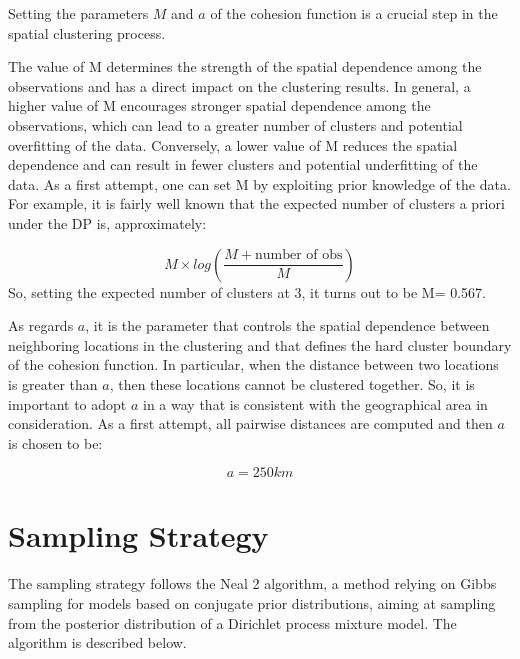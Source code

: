 \documentclass[12pt,a4paper]{article}
\begin{document}
Setting the parameters $M$ and $a$ of the cohesion function is a crucial step in the spatial clustering process. 
 
The value of M determines the strength of the spatial dependence among the observations and has a direct impact on the clustering results. In general, a higher value of M encourages stronger spatial dependence among the observations, which can lead to a greater number of clusters and potential overfitting of the data. Conversely, a lower value of M reduces the spatial dependence and can result in fewer clusters and potential underfitting of the data. 
As a first attempt, one can set M by exploiting prior knowledge of the data. For example, it is fairly well known that the expected number of clusters a priori under the DP is, approximately:

$$
M \times log \left( \frac{M+ \text{number of obs} }{M} \right)
$$
So, setting the expected number of clusters at 3, it turns out to be M= 0.567.


As regards $a$, it is the parameter that controls the spatial dependence between neighboring locations in the clustering and that defines the hard cluster boundary of the cohesion function. In particular, when the distance between two locations is greater than $a$, then these locations cannot be clustered together. So, it is important to adopt $a$ in a way that is consistent with the geographical area in consideration. As a first attempt, all pairwise distances are computed and then $a$ is chosen to be:

$$
a= 250 km
$$



\newpage
\section{Sampling Strategy}\label{sec:ss}
The sampling strategy follows the Neal 2 algorithm, a method relying on Gibbs sampling for models based on conjugate prior distributions, aiming at sampling from the posterior distribution of a Dirichlet process mixture model. 
The algorithm is described below.
\end{document}
